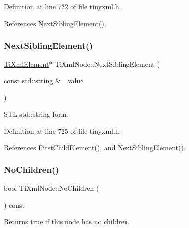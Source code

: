Definition at line 722 of file tinyxml.\+h.



References Next\+Sibling\+Element().

\hypertarget{class_ti_xml_node_a506958e34406729a4e4c5326ea39d081}{}\label{class_ti_xml_node_a506958e34406729a4e4c5326ea39d081} 
\subsubsection{\texorpdfstring{Next\+Sibling\+Element()}{NextSiblingElement()}\hspace{0.1cm}{\footnotesize\ttfamily [6/6]}}
{\footnotesize\ttfamily \hyperlink{class_ti_xml_element}{Ti\+Xml\+Element}$\ast$ Ti\+Xml\+Node\+::\+Next\+Sibling\+Element (\begin{DoxyParamCaption}\item[{const std\+::string \&}]{\+\_\+value }\end{DoxyParamCaption})\hspace{0.3cm}{\ttfamily [inline]}}



S\+TL std\+::string form. 



Definition at line 725 of file tinyxml.\+h.



References First\+Child\+Element(), and Next\+Sibling\+Element().

\hypertarget{class_ti_xml_node_abe85e0ec04ea59c033f324c8504653e5}{}\label{class_ti_xml_node_abe85e0ec04ea59c033f324c8504653e5} 
\subsubsection{\texorpdfstring{No\+Children()}{NoChildren()}}
{\footnotesize\ttfamily bool Ti\+Xml\+Node\+::\+No\+Children (\begin{DoxyParamCaption}{ }\end{DoxyParamCaption}) const\hspace{0.3cm}{\ttfamily [inline]}}



Returns true if this node has no children. 



